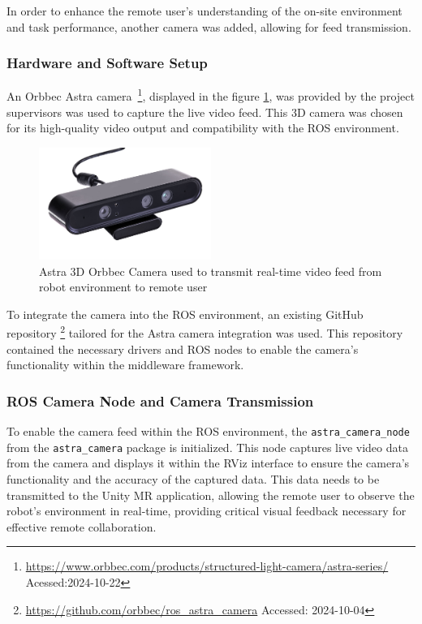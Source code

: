 In order to enhance the remote user's understanding of the on-site environment and task performance, another camera was added, allowing for feed transmission. 

\subsubsection{Hardware and Software Setup}
An Orbbec Astra camera~\footnote{\url{https://www.orbbec.com/products/structured-light-camera/astra-series/} Acessed:2024-10-22}, displayed in the figure \ref{fig:astra-camera}, was provided by the project supervisors was used to capture the live video feed. This 3D camera was chosen for its high-quality video output and compatibility with the \ac{ROS} environment.

\begin{figure}[h]
    \centering
    \includegraphics[width=0.5\textwidth]{figs/AstraSeries_3.jpg}
    \caption{Astra 3D Orbbec Camera used to transmit real-time video feed from robot environment to remote user}
    \label{fig:astra-camera}
\end{figure}
\FloatBarrier

To integrate the camera into the \ac{ROS} environment, an existing GitHub repository \footnote{\url{https://github.com/orbbec/ros_astra_camera} Accessed: 2024-10-04} tailored for the Astra camera integration was used. This repository contained the necessary drivers and \ac{ROS} nodes to enable the camera's functionality within the middleware framework.


\subsubsection{ROS Camera Node and Camera Transmission}

To enable the camera feed within the \ac{ROS} environment, the \texttt{astra\_camera\_node} from the \texttt{astra\_camera} package is initialized. This node captures live video data from the camera and displays it within the RViz interface to ensure the camera’s functionality and the accuracy of the captured data. This data needs to be transmitted to the Unity \ac{MR} application, allowing the remote user to observe the robot's environment in real-time, providing critical visual feedback necessary for effective remote collaboration.

